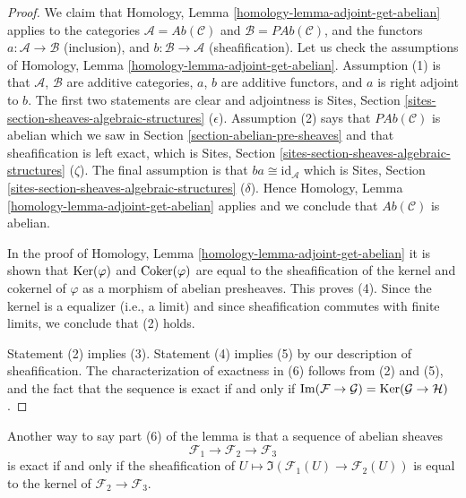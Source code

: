 \begin{proof}
We claim that Homology, Lemma \ref{homology-lemma-adjoint-get-abelian}
applies to the categories $\mathcal{A} = \textit{Ab}(\mathcal{C})$
and $\mathcal{B} = \textit{PAb}(\mathcal{C})$, and the functors
$a : \mathcal{A} \to \mathcal{B}$ (inclusion),  and
$b : \mathcal{B} \to \mathcal{A}$ (sheafification).
Let us check the assumptions of
Homology, Lemma \ref{homology-lemma-adjoint-get-abelian}.
Assumption (1) is that $\mathcal{A}$, $\mathcal{B}$ are additive categories,
$a$, $b$ are additive functors, and $a$ is right adjoint to $b$.
The first two statements are clear and adjointness is
Sites, Section \ref{sites-section-sheaves-algebraic-structures} ($\epsilon$).
Assumption (2) says that $\textit{PAb}(\mathcal{C})$ is abelian
which we saw in Section \ref{section-abelian-pre-sheaves} and
that sheafification is left exact, which is
Sites, Section \ref{sites-section-sheaves-algebraic-structures} ($\zeta$).
The final assumption is that $ba \cong \text{id}_\mathcal{A}$ which is
Sites, Section \ref{sites-section-sheaves-algebraic-structures} ($\delta$).
Hence Homology, Lemma \ref{homology-lemma-adjoint-get-abelian}
applies and we conclude that $\textit{Ab}(\mathcal{C})$ is abelian.

\medskip\noindent
In the proof of Homology, Lemma \ref{homology-lemma-adjoint-get-abelian}
it is shown that $\mathop{\mathrm{Ker}}(\varphi)$ and $\mathop{\mathrm{Coker}}(\varphi)$
are equal to the sheafification of the kernel and cokernel of $\varphi$
as a morphism of abelian presheaves. This proves (4). Since the kernel
is a equalizer (i.e., a limit) and since sheafification commutes with
finite limits, we conclude that (2) holds.

\medskip\noindent
Statement (2) implies (3). Statement (4) implies (5) by our description
of sheafification. The characterization of exactness in (6) follows from
(2) and (5), and the fact that the sequence is exact if and only if
$\mathop{\mathrm{Im}}(\mathcal{F} \to \mathcal{G}) =
\mathop{\mathrm{Ker}}(\mathcal{G} \to \mathcal{H})$.
\end{proof}

\noindent
Another way to say part (6) of the lemma is that a
sequence of abelian sheaves
$$
\mathcal{F}_1 \longrightarrow
\mathcal{F}_2 \longrightarrow
\mathcal{F}_3
$$
is exact if and only if the sheafification of
$U \mapsto \Im(\mathcal{F}_1(U) \to \mathcal{F}_2(U))$
is equal to the kernel of $\mathcal{F}_2 \to \mathcal{F}_3$.

